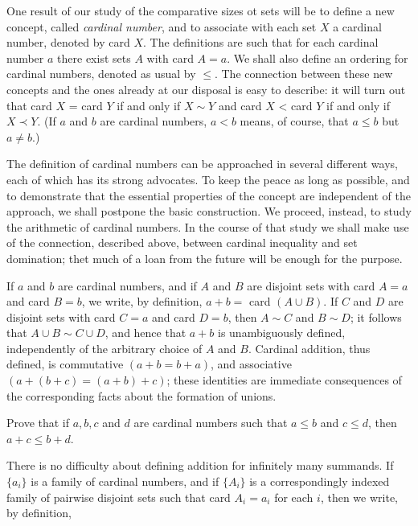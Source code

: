 
One result of our study of the comparative sizes ot sets will be to define a new concept, called \textit{cardinal number}, and to associate with each set $X$ a cardinal number, denoted by card $X$. The definitions are such that for each cardinal number $a$ there exist sets $A$ with card $A = a$. We shall also define an ordering for cardinal numbers, denoted as usual by $\le$. The connection between these new concepts and the ones already at our disposal is easy to describe: it will turn out that card $X$ = card $Y$ if and only if $X \sim Y$ and card $X$ < card $Y$ if and only if $X \prec Y$. (If $a$ and $b$ are cardinal numbers, $a < b$ means, of course, that $a \le b$ but $a \neq b$.)

The definition of cardinal numbers can be approached in several different ways, each of which has its strong advocates. To keep the peace as long as possible, and to demonstrate that the essential properties of the concept are independent of the approach, we shall postpone the basic construction. We proceed, instead, to study the arithmetic of cardinal numbers. In the course of that study we shall make use of the connection, described above, between cardinal inequality and set domination; thet much of a loan from the future will be enough for the purpose.

If $a$ and $b$ are cardinal numbers, and if $A$ and $B$ are disjoint sets with card $A = a$ and card $B = b$, we write, by definition, $a + b =$ card $(A \cup B)$. If $C$ and $D$ are disjoint sets with card $C = a$ and card $D = b$, then $A \sim C$ and $B \sim D$; it follows that $A \cup B \sim C \cup D$, and hence that $a + b$ is unambiguously defined, independently of the arbitrary choice of $A$ and $B$. Cardinal addition, thus defined, is commutative $(a + b = b + a)$, and associative $(a + (b + c) = (a + b) + c)$; these identities are immediate consequences of the corresponding facts about the formation of unions.

\begin{exercise} Prove that if $a, b, c$ and $d$ are cardinal numbers such that $a \le b$ and $c \le d$, then $a + c \le b + d$. 
\end{exercise}

There is no difficulty about defining addition for infinitely many summands. If $\{ a_{i} \}$ is a family of cardinal numbers, and if $\{ A_{i} \}$ is a correspondingly indexed family of pairwise disjoint sets such that card $A_{i} = a_{i}$ for each $i$, then we write, by definition,

